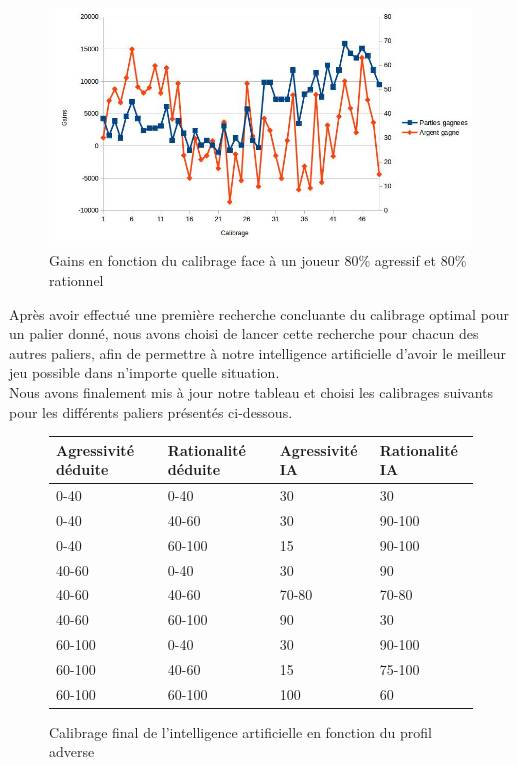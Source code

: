 \documentclass{report}
\begin{document}
\begin{figure}[H]
	\begin{center}
		\includegraphics[scale=0.5]{./imagesRapport/rechercheCalibrageOptimal8080.jpg}
	\end{center}
	\caption{Gains en fonction du calibrage face à un joueur 80\% agressif et 80\% rationnel}
\end{figure}


Après avoir effectué une première recherche concluante du calibrage optimal pour un palier donné, nous avons choisi de lancer cette recherche pour chacun des autres paliers, afin de permettre à notre intelligence artificielle d'avoir le meilleur jeu possible dans n'importe quelle situation.\\

Nous avons finalement mis à jour notre tableau et choisi les calibrages suivants pour les différents paliers présentés ci-dessous.

\begin{figure}[H]
\begin{center}
\begin{tabular}{|l|l|l|l|}
\hline
Agressivité déduite &	Rationalité déduite &	Agressivité IA & 	Rationalité IA\\
\hline
0-40	 & 0-40 &	30 &	30\\
\hline
0-40 &	40-60 &	30 &	90-100\\
\hline
0-40	 & 60-100 &	15&	90-100\\
\hline
40-60 &	0-40 &	30 &	90\\
\hline
40-60 &	40-60 &	70-80 & 70-80\\
\hline
40-60 &	60-100 &	 90 &	30\\
\hline
60-100 &	 0-40 &	30 & 	90-100\\
\hline
60-100 & 	40-60 &	15 & 	75-100\\
\hline
60-100 &	 60-100 &	100 &	60\\
\hline
\end{tabular}
\end{center}
\caption{Calibrage final de l'intelligence artificielle en fonction du profil adverse}
\end{figure}
\end{document}
